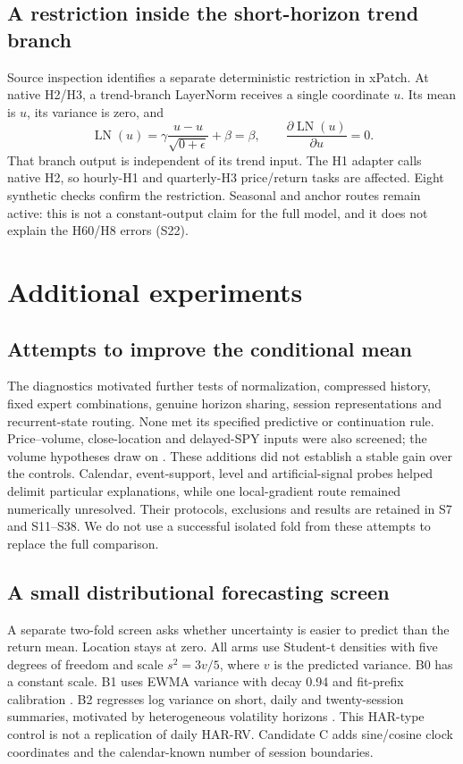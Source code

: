 \subsection{A restriction inside the short-horizon trend branch}

Source inspection identifies a separate deterministic restriction in xPatch. At native H2/H3, a trend-branch LayerNorm receives a single coordinate \(u\). Its mean is \(u\), its variance is zero, and
\[
\operatorname{LN}(u)=\gamma\frac{u-u}{\sqrt{0+\epsilon}}+\beta=\beta,
\qquad \frac{\partial\operatorname{LN}(u)}{\partial u}=0.
\]
That branch output is independent of its trend input. The H1 adapter calls native H2, so hourly-H1 and quarterly-H3 price/return tasks are affected. Eight synthetic checks confirm the restriction. Seasonal and anchor routes remain active: this is not a constant-output claim for the full model, and it does not explain the H60/H8 errors (S22).

\section{Additional experiments}\label{sec:followups}

\subsection{Attempts to improve the conditional mean}

The diagnostics motivated further tests of normalization, compressed history, fixed expert combinations, genuine horizon sharing, session representations and recurrent-state routing. None met its specified predictive or continuation rule. Price--volume, close-location and delayed-SPY inputs were also screened; the volume hypotheses draw on \cite{r17,r18}. These additions did not establish a stable gain over the controls. Calendar, event-support, level and artificial-signal probes helped delimit particular explanations, while one local-gradient route remained numerically unresolved. Their protocols, exclusions and results are retained in S7 and S11--S38. We do not use a successful isolated fold from these attempts to replace the full comparison.

\subsection{A small distributional forecasting screen}

A separate two-fold screen asks whether uncertainty is easier to predict than the return mean. Location stays at zero. All arms use Student-t densities with five degrees of freedom and scale \(s^2=3v/5\), where \(v\) is the predicted variance. B0 has a constant scale. B1 uses EWMA variance with decay 0.94 and fit-prefix calibration \cite{r20}. B2 regresses log variance on short, daily and twenty-session summaries, motivated by heterogeneous volatility horizons \cite{r21}. This HAR-type control is not a replication of daily HAR-RV. Candidate C adds sine/cosine clock coordinates and the calendar-known number of session boundaries.

